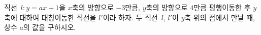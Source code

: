 직선~$l:y=ax+1$을 $x$축의 방향으로 $-3$만큼, $y$축의 방향으로 $4$만큼 평행이동한 후 $y$축에 대하여 대칭이동한 직선을 $l'$이라 하자. 두 직선~$l$, $l'$이 $y$축 위의 점에서 만날 때, 상수 $a$의 값을 구하시오.
